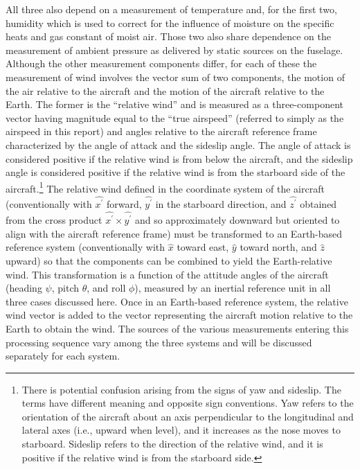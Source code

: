 \documentclass[12pt,twoside,english]{article}\usepackage[]{graphicx}\usepackage[]{color}
\let\OrgIndex\index
\renewcommand*{\index}[1]{\OrgIndex{#1}}
\begin{document}
All three also depend on a measurement of temperature and, for the first two, humidity which is used to correct for the influence of moisture on the specific heats and gas constant of moist air. Those two also share dependence on the measurement of ambient pressure as delivered by static sources on the fuselage. Although the other measurement components differ, for each of these the measurement of wind involves the vector sum of two components, the motion of the air relative to the aircraft and the motion of the aircraft relative to the Earth. The former is the ``relative wind'' and is measured as a three-component vector having magnitude equal to the ``true airspeed'' (referred to simply as the airspeed in this report) and angles relative to the aircraft reference frame characterized by the angle of attack and the sideslip angle. The angle of attack is considered positive if the relative wind is from below the aircraft, and the sideslip angle is considered positive if the relative wind is from the starboard side of the aircraft.\footnote{There is potential confusion arising from the signs of yaw and sideslip. The terms have different meaning and opposite sign conventions. Yaw refers to the orientation of the aircraft about an axis perpendicular to the longitudinal and lateral axes (i.e., upward when level), and it increases as the nose moves to starboard. Sideslip refers to the direction of the relative wind, and it is positive if the relative wind is from the starboard side.} The relative wind defined in the coordinate system of the aircraft (conventionally with $\hat{x^{\prime}}$ forward, $\hat{y^{\prime}}$ in the starboard direction, and $\hat{z^{\prime}}$ obtained from the cross product $\hat{x^{\prime}}\times\hat{y^{\prime}}$ and so approximately downward but oriented to align with the aircraft reference frame) must be transformed to an Earth-based reference system (conventionally with $\hat{x}$ toward east, $\hat{y}$ toward north, and $\hat{z}$ upward) so that the components can be combined to yield the Earth-relative wind. This transformation is a function of the attitude angles of the aircraft (heading $\psi$, pitch $\theta$, and roll $\phi$), measured by an inertial reference unit in all three cases discussed here. Once in an Earth-based reference system, the relative wind vector is added to the vector representing the aircraft motion relative to the Earth to obtain the wind. The sources of the various measurements entering this processing sequence vary among the three systems and will be discussed separately for each system. 
\end{document}
